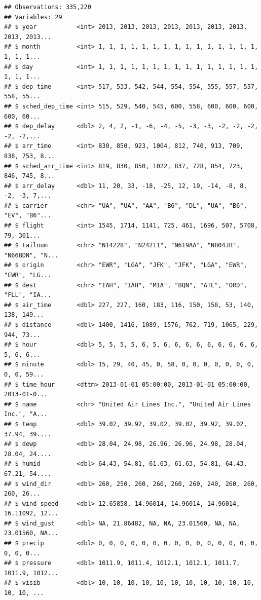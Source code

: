 \documentclass[]{tufte-book}
\newenvironment{Shaded}{}{}
\newcommand{\NormalTok}[1]{#1}
\newcommand{\OperatorTok}[1]{\textcolor[rgb]{0.40,0.40,0.40}{#1}}
\newcommand{\StringTok}[1]{\textcolor[rgb]{0.25,0.44,0.63}{#1}}
\begin{document}
\begin{Shaded}
\end{Shaded}

\begin{verbatim}
## Observations: 335,220
## Variables: 29
## $ year           <int> 2013, 2013, 2013, 2013, 2013, 2013, 2013, 2013, 2013...
## $ month          <int> 1, 1, 1, 1, 1, 1, 1, 1, 1, 1, 1, 1, 1, 1, 1, 1, 1, 1...
## $ day            <int> 1, 1, 1, 1, 1, 1, 1, 1, 1, 1, 1, 1, 1, 1, 1, 1, 1, 1...
## $ dep_time       <int> 517, 533, 542, 544, 554, 554, 555, 557, 557, 558, 55...
## $ sched_dep_time <int> 515, 529, 540, 545, 600, 558, 600, 600, 600, 600, 60...
## $ dep_delay      <dbl> 2, 4, 2, -1, -6, -4, -5, -3, -3, -2, -2, -2, -2, -2,...
## $ arr_time       <int> 830, 850, 923, 1004, 812, 740, 913, 709, 838, 753, 8...
## $ sched_arr_time <int> 819, 830, 850, 1022, 837, 728, 854, 723, 846, 745, 8...
## $ arr_delay      <dbl> 11, 20, 33, -18, -25, 12, 19, -14, -8, 8, -2, -3, 7,...
## $ carrier        <chr> "UA", "UA", "AA", "B6", "DL", "UA", "B6", "EV", "B6"...
## $ flight         <int> 1545, 1714, 1141, 725, 461, 1696, 507, 5708, 79, 301...
## $ tailnum        <chr> "N14228", "N24211", "N619AA", "N804JB", "N668DN", "N...
## $ origin         <chr> "EWR", "LGA", "JFK", "JFK", "LGA", "EWR", "EWR", "LG...
## $ dest           <chr> "IAH", "IAH", "MIA", "BQN", "ATL", "ORD", "FLL", "IA...
## $ air_time       <dbl> 227, 227, 160, 183, 116, 150, 158, 53, 140, 138, 149...
## $ distance       <dbl> 1400, 1416, 1089, 1576, 762, 719, 1065, 229, 944, 73...
## $ hour           <dbl> 5, 5, 5, 5, 6, 5, 6, 6, 6, 6, 6, 6, 6, 6, 6, 5, 6, 6...
## $ minute         <dbl> 15, 29, 40, 45, 0, 58, 0, 0, 0, 0, 0, 0, 0, 0, 0, 59...
## $ time_hour      <dttm> 2013-01-01 05:00:00, 2013-01-01 05:00:00, 2013-01-0...
## $ name           <chr> "United Air Lines Inc.", "United Air Lines Inc.", "A...
## $ temp           <dbl> 39.02, 39.92, 39.02, 39.02, 39.92, 39.02, 37.94, 39....
## $ dewp           <dbl> 28.04, 24.98, 26.96, 26.96, 24.98, 28.04, 28.04, 24....
## $ humid          <dbl> 64.43, 54.81, 61.63, 61.63, 54.81, 64.43, 67.21, 54....
## $ wind_dir       <dbl> 260, 250, 260, 260, 260, 260, 240, 260, 260, 260, 26...
## $ wind_speed     <dbl> 12.65858, 14.96014, 14.96014, 14.96014, 16.11092, 12...
## $ wind_gust      <dbl> NA, 21.86482, NA, NA, 23.01560, NA, NA, 23.01560, NA...
## $ precip         <dbl> 0, 0, 0, 0, 0, 0, 0, 0, 0, 0, 0, 0, 0, 0, 0, 0, 0, 0...
## $ pressure       <dbl> 1011.9, 1011.4, 1012.1, 1012.1, 1011.7, 1011.9, 1012...
## $ visib          <dbl> 10, 10, 10, 10, 10, 10, 10, 10, 10, 10, 10, 10, 10, ...
\end{verbatim}
\end{document}
